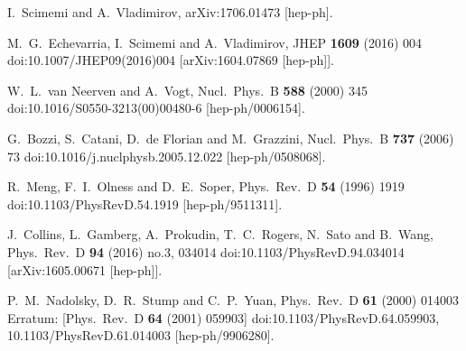 \documentclass[10pt,a4paper]{article}
\begin{document}
\begin{thebibliography}{alp}

  I.~Scimemi and A.~Vladimirov,
  arXiv:1706.01473 [hep-ph].

  M.~G.~Echevarria, I.~Scimemi and A.~Vladimirov,
  JHEP {\bf 1609} (2016) 004
  doi:10.1007/JHEP09(2016)004
  [arXiv:1604.07869 [hep-ph]].

  W.~L.~van Neerven and A.~Vogt,
  Nucl.\ Phys.\ B {\bf 588} (2000) 345
  doi:10.1016/S0550-3213(00)00480-6
  [hep-ph/0006154].

  G.~Bozzi, S.~Catani, D.~de Florian and M.~Grazzini,
  Nucl.\ Phys.\ B {\bf 737} (2006) 73
  doi:10.1016/j.nuclphysb.2005.12.022
  [hep-ph/0508068].

  R.~Meng, F.~I.~Olness and D.~E.~Soper,
  Phys.\ Rev.\ D {\bf 54} (1996) 1919
  doi:10.1103/PhysRevD.54.1919
  [hep-ph/9511311].

  J.~Collins, L.~Gamberg, A.~Prokudin, T.~C.~Rogers, N.~Sato and B.~Wang,
  Phys.\ Rev.\ D {\bf 94} (2016) no.3,  034014
  doi:10.1103/PhysRevD.94.034014
  [arXiv:1605.00671 [hep-ph]].

  P.~M.~Nadolsky, D.~R.~Stump and C.~P.~Yuan,
  Phys.\ Rev.\ D {\bf 61} (2000) 014003
   Erratum: [Phys.\ Rev.\ D {\bf 64} (2001) 059903]
  doi:10.1103/PhysRevD.64.059903, 10.1103/PhysRevD.61.014003
  [hep-ph/9906280].


\end{thebibliography}
\end{document}
